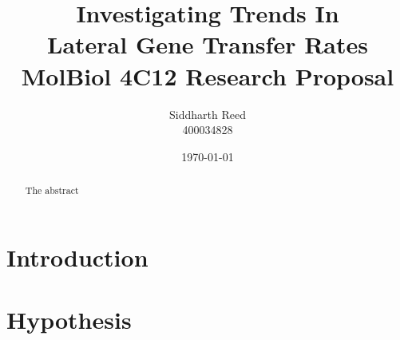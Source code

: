 \documentclass[12pt,letter]{article}
\begin{document}
\linespread{1.25} %
\title{Investigating Trends In \\Lateral Gene Transfer Rates\\ \vspace{0.25in}
       \large MolBiol 4C12 Research Proposal}
\author{Siddharth Reed\\ 400034828}
\date{\today}
\maketitle
\newpage
\begin{abstract}
    The abstract
\end{abstract}
\section*{Introduction} %
\section*{Hypothesis} %
\end{document}
